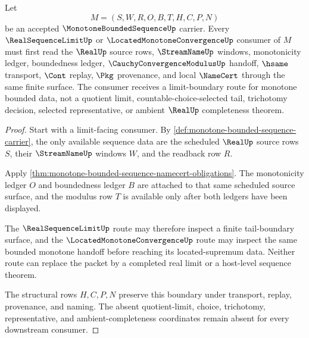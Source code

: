 \begin{theorem}
\label{thm:monotone-bounded-sequence-finite-limit-boundary}
Let
$$
M=(S,W,R,O,B,T,H,C,P,N)
$$
be an accepted $\MonotoneBoundedSequenceUp$ carrier. Every $\RealSequenceLimitUp$ or $\LocatedMonotoneConvergenceUp$ consumer of $M$ must first read the $\RealUp$ source rows, $\StreamNameUp$ windows, monotonicity ledger, boundedness ledger, $\CauchyConvergenceModulusUp$ handoff, $\hsame$ transport, $\Cont$ replay, $\Pkg$ provenance, and local $\NameCert$ through the same finite surface. The consumer receives a limit-boundary route for monotone bounded data, not a quotient limit, countable-choice-selected tail, trichotomy decision, selected representative, or ambient $\RealUp$ completeness theorem.
\end{theorem}
\begin{proof}
Start with a limit-facing consumer. By \autoref{def:monotone-bounded-sequence-carrier}, the only available sequence data are the scheduled $\RealUp$ source rows $S$, their $\StreamNameUp$ windows $W$, and the readback row $R$.

Apply \autoref{thm:monotone-bounded-sequence-namecert-obligations}. The monotonicity ledger $O$ and boundedness ledger $B$ are attached to that same scheduled source surface, and the modulus row $T$ is available only after both ledgers have been displayed.

The $\RealSequenceLimitUp$ route may therefore inspect a finite tail-boundary surface, and the $\LocatedMonotoneConvergenceUp$ route may inspect the same bounded monotone handoff before reaching its located-supremum data. Neither route can replace the packet by a completed real limit or a host-level sequence theorem.

The structural rows $H,C,P,N$ preserve this boundary under transport, replay, provenance, and naming. The absent quotient-limit, choice, trichotomy, representative, and ambient-completeness coordinates remain absent for every downstream consumer.
\end{proof}

